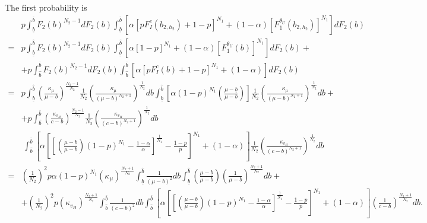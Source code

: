 \documentclass[11pt]{article}
\theoremstyle{plain}
\theoremstyle{definition}
\theoremstyle{plain}
\theoremstyle{plain}
\theoremstyle{plain}
\theoremstyle{plain}
\numberwithin{equation}{section}
\begin{document}
\noindent The first probability is
{\footnotesize
\begin{align*}
    & p \int_{\underline{b}}^{\overline{b}}F_2(b)^{N_2-1} dF_2(b) \int_{\underline{b}}^{\overline{b}}  \left[\alpha \left[pF_I^c(b_{2,h_2}) + 1-p \right]^{N_1} + (1-\alpha) \left[F_1^{\theta_U}(b_{2,h_2})\right]^{N_1}\right]  dF_2(b) \\[5pt]
    = & p \int_{\underline{b}}^{\hat{b}}F_2(b)^{N_2-1} dF_2(b) \int_{\underline{b}}^{\hat{b}} \left[\alpha \left[1-p \right]^{N_1} + (1-\alpha) \left[F_1^{\theta_U}(b)\right]^{N_1}\right]  dF_2(b) + \\[5pt]
    & + p \int_{\hat{b}}^{\overline{b}}F_2(b)^{N_2-1} dF_2(b) \int_{\hat{b}}^{\overline{b}} \left[\alpha \left[pF_I^c(b) + 1-p \right]^{N_1} + (1-\alpha) \right]  dF_2(b) \\[5pt]
    = & p \int_{\underline{b}}^{\hat{b}}\left(\frac{\kappa_{\mu}}{\mu-b}\right)^{\frac{N_2-1}{N_2}} \frac{1}{N_2}\left(\frac{\kappa_{\mu}}{(\mu-b)^{N_2+1}}\right)^{\frac{1}{N_2}} db  \int_{\underline{b}}^{\hat{b}} \left[\alpha (1-p)^{N_1}  \left( \frac{\mu-\underline{b}}{\mu - b}\right)\right] \frac{1}{N_2}\left(\frac{\kappa_{\mu}}{(\mu-b)^{N_2+1}}\right)^{\frac{1}{N_2}}  db + \\[5pt]
    & + p \int_{\hat{b}}^{\overline{b}}\left(\frac{\kappa_{v_H}}{c-b}\right)^{\frac{N_2-1}{N_2}} \frac{1}{N_2}\left(\frac{\kappa_{v_H}}{(c-b)^{N_2+1}}\right)^{\frac{1}{N_2}} db \\[5pt] 
    & \ \int_{\hat{b}}^{\overline{b}} \left[ \alpha \left[\left[ \left( \frac{\mu-\underline{b}}{\mu - b}\right) (1-p)^{N_1} - \frac{1-\alpha}{\alpha}\right]^{\frac{1}{N_1}} - \frac{1-p}{p} \right]^{N_1} + (1-\alpha) \right] \frac{1}{N_2}\left(\frac{\kappa_{v_H}}{(c-b)^{N_2+1}}\right)^{\frac{1}{N_2}}  db \\[5pt] 
    = & \left(\frac{1}{N_2}\right)^2 p\alpha (1-p)^{N_1} (\kappa_{\mu})^{\frac{N_2+1}{N_2}} \int_{\underline{b}}^{\hat{b}}\frac{1}{(\mu-b)^2}db  \int_{\underline{b}}^{\hat{b}}   \left( \frac{\mu-\underline{b}}{\mu - b}\right) \left(\frac{1}{\mu-b}\right)^{\frac{N_2+1}{N_2}}  db + \\[5pt]
    & + \left(\frac{1}{N_2}\right)^2p (\kappa_{v_H})^{\frac{N_2+1}{N_2}} \int_{\hat{b}}^{\overline{b}}\frac{1}{(c-b)^2} db \int_{\hat{b}}^{\overline{b}} \left[ \alpha \left[\left[ \left( \frac{\mu-\underline{b}}{\mu - b}\right) (1-p)^{N_1} - \frac{1-\alpha}{\alpha}\right]^{\frac{1}{N_1}} - \frac{1-p}{p} \right]^{N_1} + (1-\alpha) \right] \left(\frac{1}{c-b}\right)^{\frac{N_2+1}{N_2}} db.
\end{align*}
}
\end{document}
